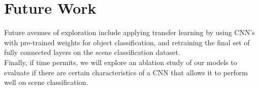 \documentclass[10pt,twocolumn,letterpaper]{article}
\begin{document}
\section{Future Work}

Future avenues of exploration include applying transfer learning by using
CNN's with pre-trained weights for object classification, and retraining the
final set of fully connected layers on the scene classification dataset.\\

Finally, if time permits, we will explore an ablation study of our models to
evaluate if there are certain characteristics of a CNN that allows it to perform
well on scene classification.\\


\nocite{Lin}
\nocite{Wu}


{\small


}
\end{document}
